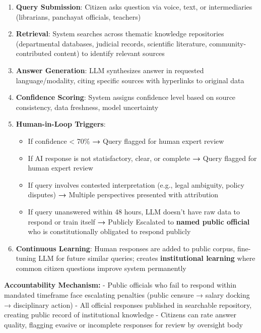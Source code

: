 \begin{enumerate}
\def\labelenumi{\arabic{enumi}.}
\tightlist
\item
  \textbf{Query Submission}: Citizen asks question via voice, text, or
  intermediaries (librarians, panchayat officials, teachers)
\item
  \textbf{Retrieval}: System searches across thematic knowledge
  repositories (departmental databases, judicial records, scientific
  literature, community-contributed content) to identify relevant
  sources
\item
  \textbf{Answer Generation}: LLM synthesizes answer in requested
  language/modality, citing specific sources with hyperlinks to original
  data
\item
  \textbf{Confidence Scoring}: System assigns confidence level based on
  source consistency, data freshness, model uncertainty
\item
  \textbf{Human-in-Loop Triggers}:

  \begin{itemize}
  \tightlist
  \item
    If confidence \textless{} 70\% \textbf{→} Query flagged for human
    expert review
  \item
    If AI response is not statisfactory, clear, or complete \textbf{→}
    Query flagged for human expert review
  \item
    If query involves contested interpretation (e.g., legal ambiguity,
    policy disputes) \textbf{→} Multiple perspectives presented with
    attribution
  \item
    If query unanswered within 48 hours, LLM doesn't have raw data to
    respond or train itself \textbf{→} Publicly Escalated to
    \textbf{named public official} who is constitutionally obligated to
    respond publicly
  \end{itemize}
\item
  \textbf{Continuous Learning}: Human responses are added to public
  corpus, fine-tuning LLM for future similar queries; creates
  \textbf{institutional learning} where common citizen questions improve
  system permanently
\end{enumerate}

\textbf{Accountability Mechanism:} - Public officials who fail to
respond within mandated timeframe face escalating penalties (public
censure → salary docking → disciplinary action) - All official responses
published in searchable repository, creating public record of
institutional knowledge - Citizens can rate answer quality, flagging
evasive or incomplete responses for review by oversight body

